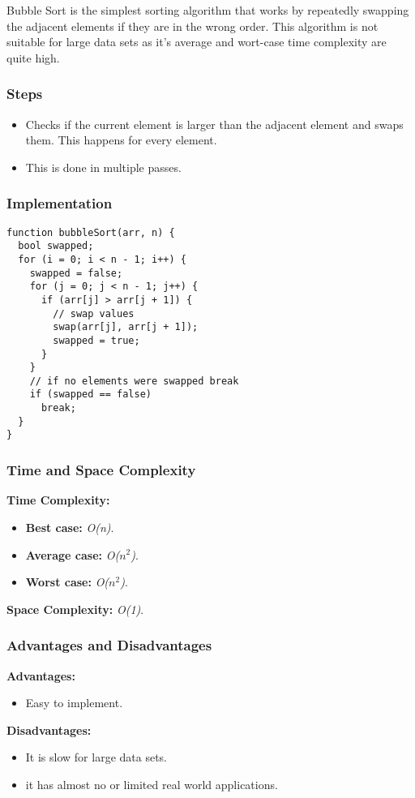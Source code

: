 Bubble Sort is the simplest sorting algorithm that works by repeatedly swapping the adjacent elements if they are in the wrong order. This algorithm is not suitable for large data sets as it's average and wort-case time complexity are quite high.

\subsubsection*{Steps}

\begin{itemize}
  \item Checks if the current element is larger than the adjacent element and swaps them. This happens for every element.
  \item This is done in multiple passes.
\end{itemize}

\subsubsection*{Implementation}

\begin{lstlisting}[style=general]
function bubbleSort(arr, n) {
  bool swapped;
  for (i = 0; i < n - 1; i++) {
    swapped = false;
    for (j = 0; j < n - 1; j++) {
      if (arr[j] > arr[j + 1]) {
        // swap values
        swap(arr[j], arr[j + 1]);
        swapped = true;
      }
    }
    // if no elements were swapped break
    if (swapped == false)
      break;
  }
}
\end{lstlisting}

\subsubsection*{Time and Space Complexity}

\textbf{Time Complexity:}

\begin{itemize}
  \item \textbf{Best case:} \textit{O(n)}.
  \item \textbf{Average case:} \emph{O($n^2$)}.
  \item \textbf{Worst case:} \textit{O($n^2$)}.
\end{itemize}

\textbf{Space Complexity:} \textit{O(1)}.

\subsubsection*{Advantages and Disadvantages}

\textbf{Advantages:}

\begin{itemize}
  \item Easy to implement.
\end{itemize}

\textbf{Disadvantages:}

\begin{itemize}
  \item It is slow for large data sets.
  \item it has almost no or limited real world applications.
\end{itemize}
